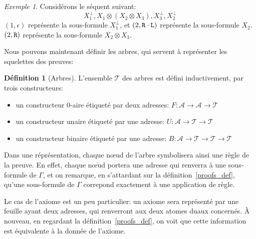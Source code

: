 \documentclass[11pt,a4paper]{article}
\theoremstyle{plain}
\theoremstyle{definition}
\newtheorem{definition}{Définition}
\theoremstyle{remark}
\newtheorem{example}{Exemple}
\newcommand*{\orth}{^\perp}
\newcommand*{\tensor}{\otimes}
\newcommand*{\sequent}{\Gamma}
\newcommand*{\Left}{\textnormal{\texttt{L}}}
\newcommand*{\Right}{\textnormal{\texttt{R}}}
\newcommand*{\trees}{\ensuremath{\mathcal{T}}}
\begin{document}
\begin{example}
Considérons le séquent suivant:
\begin{equation*}
X_1\orth, X_1 \tensor (X_2 \tensor X_3), X_3\orth, X_2\orth
\end{equation*}
$(1, \epsilon)$ représente la sous-formule $X_1\orth$, et $(2, \Right \cdot \Left)$ représente la sous-formule $X_2$. $(2, \Right)$ représente la sous-formule $X_2 \tensor X_3$.
\end{example}

Nous pouvons maintenant définir les arbres, qui servent à représenter les squelettes des preuves:

\begin{definition}[Arbres]
\label{def_trees}
L'ensemble \trees{} des arbres est défini inductivement, par trois constructeurs:
\begin{itemize}
  \item un constructeur $0$-aire étiqueté par deux adresses: $F: \mathcal{A} \rightarrow \mathcal{A} \rightarrow \trees$
  \item un constructeur unaire étiqueté par une adresse: $U: \mathcal{A} \rightarrow \trees \rightarrow \trees$
  \item un constructeur binaire étiqueté par une adresse: $B: \mathcal{A} \rightarrow \trees \rightarrow \trees \rightarrow \trees$
\end{itemize}
\end{definition}

Dans une réprésentation, chaque n\oe ud de l'arbre symbolisera ainsi une règle de la preuve. En effet, chaque n\oe ud portera une adresse qui renverra à une sous-formule de $\sequent$, et on remarque, en s'attardant sur la définition~\ref{proofs_def}, qu'une sous-formule de $\sequent$ correpond exactement à une application de règle.

Le cas de l'axiome est un peu particulier: un axiome sera représenté par une feuille ayant deux adresses, qui renverront aux deux atomes duaux concernés. À nouveau, en regardant la définition~\ref{proofs_def}, on voit que cette information est équivalente à la donnée de l'axiome.
\end{document}

